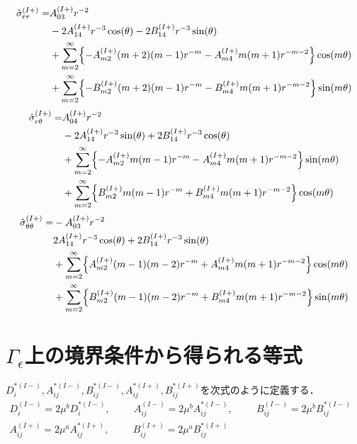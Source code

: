 \begin{align}
	\hat{\sigma}_{rr}^{(I+)} =&A_{03}^{(I+)}r^{-2}
	\nonumber
	\\
	&-2A_{14}^{(I+)}r^{-3}\cos(\theta)
	-2B_{14}^{(I+)}r^{-3}\sin(\theta)
	\nonumber
	\\
	&+\sum_{m=2}^{\infty}\Bigl\{
	-A_{m2}^{(I+)}(m+2)(m-1)r^{-m}
	-A_{m4}^{(I+)}m(m+1)r^{-m-2}\Bigr\}\cos(m\theta)
	\nonumber
	\\
	&+\sum_{m=2}^{\infty}\Bigl\{
	-B_{m2}^{(I+)}(m+2)(m-1)r^{-m}
	-B_{m4}^{(I+)}m(m+1)r^{-m-2}\Bigr\}\sin(m\theta)
	\label{eq:SigmaRROut1}
\end{align}
\begin{align}
	\hat{\sigma}_{r\theta}^{(I+)} =&A_{04}^{(I+)}r^{-2}
	\nonumber
	\\
	&-2A_{14}^{(I+)}r^{-3}\sin(\theta)
	+2B_{14}^{(I+)}r^{-3}\cos(\theta)
	\nonumber
	\\
	&+\sum_{m=2}^{\infty}\Bigl\{
	-A_{m2}^{(I+)}m(m-1)r^{-m}
	-A_{m4}^{(I+)}m(m+1)r^{-m-2}\Bigr\}\sin(m\theta)
	\nonumber
	\\
	&+\sum_{m=2}^{\infty}\Bigl\{
	B_{m2}^{(I+)}m(m-1)r^{-m}
	+B_{m4}^{(I+)}m(m+1)r^{-m-2}\Bigr\}\cos(m\theta)
	\label{eq:SigmaRThOut1}
\end{align}
\begin{align}
	\hat{\sigma}_{\theta\theta}^{(I+)} =&-A_{03}^{(I+)}r^{-2}
	\nonumber
	\\
	&2A_{14}^{(I+)}r^{-3}\cos(\theta)+2B_{14}^{(I+)}r^{-3}\sin(\theta)
	\nonumber
	\\
	&+\sum_{m=2}^{\infty}\Bigl\{A_{m2}^{(I+)}(m-1)(m-2)r^{-m}
	+A_{m4}^{(I+)}m(m+1)r^{-m-2}\Bigr\}\cos(m\theta)
	\nonumber
	\\
	&+\sum_{m=2}^{\infty}\Bigl\{B_{m2}^{(I+)}(m-1)(m-2)r^{-m}
	+B_{m4}^{(I+)}m(m+1)r^{-m-2}\Bigr\}\sin(m\theta)
	\label{eq:SigmaThThOut1}
\end{align}
\newpage

\section{$\Gamma_{\epsilon}$上の境界条件から得られる等式}
$D_{i}^{*(I-)},A_{ij}^{*(I-)},B_{ij}^{*(I-)},A_{ij}^{*(I+)},B_{ij}^{*(I+)}$を次式のように定義する．
\begin{align}
	D_{i}^{(I-)}=2\mu^{b}D_{i}^{*(I-)},\hspace{1cm}A_{ij}^{(I-)}=2\mu^{b}A_{ij}^{*(I-)},\hspace{1cm}
	B_{ij}^{(I-)}=2\mu^{b}B_{ij}^{*(I-)}&
	\nonumber
	\\
	A_{ij}^{(I+)}=2\mu^{a}A_{ij}^{*(I+)},\hspace{1cm}
	B_{ij}^{(I+)}=2\mu^{a}B_{ij}^{*(I+)}&
	\label{eq:ChangeCoef}
\end{align}

